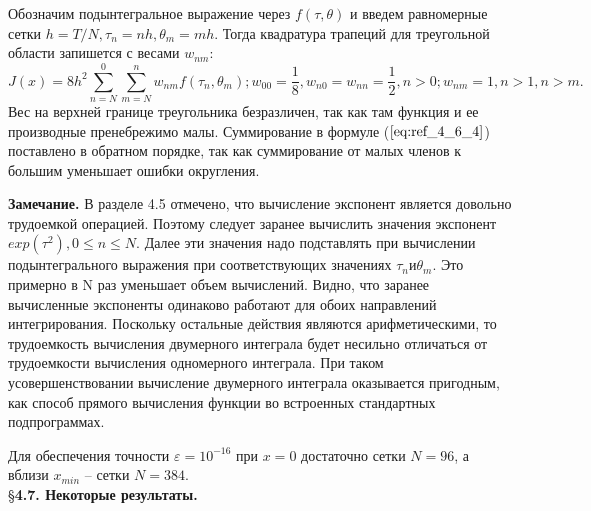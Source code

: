 Обозначим подынтегральное выражение через $f(\tau, \theta)$ и введем
равномерные сетки $h = T/N, \tau_n = nh, \theta_m = mh$. Тогда квадратура трапеций для
треугольной области запишется с весами $w_{nm}$:
\begin{equation}
J(x)=8h^2 \sum_{n=N}^0 \sum_{m=N}^n w_{nm} f(\tau_n, \theta_m);
w_{00}=\frac{1}{8}, w_{n0}=w_{nn}=\frac{1}{2},n>0;w_{nm}=1,n>1,n>m.
\label{eq:ref_4_6_4}
\end{equation}
Вес на верхней границе треугольника безразличен, так как там функция и ее
производные пренебрежимо малы. Суммирование в формуле ($\ref{eq:ref_4_6_4}$) поставлено в
обратном порядке, так как суммирование от малых членов к большим
уменьшает ошибки округления.

\textbf{Замечание.} В разделе 4.5 отмечено, что вычисление экспонент является довольно трудоемкой
операцией. Поэтому следует заранее вычислить значения экспонент $exp(\tau^2), 0 \leqslant n \leqslant N$. Далее эти значения надо подставлять при вычислении
подынтегрального выражения при соответствующих значениях $\tau_n и \theta_m$. Это
примерно в  N раз уменьшает объем вычислений. Видно, что заранее
вычисленные экспоненты одинаково работают для обоих направлений
интегрирования. Поскольку остальные действия являются арифметическими, то
трудоемкость вычисления двумерного интеграла будет несильно отличаться от
трудоемкости вычисления одномерного интеграла. При таком
усовершенствовании вычисление двумерного интеграла оказывается
пригодным, как способ прямого вычисления функции во встроенных
стандартных подпрограммах.

Для обеспечения точности $\varepsilon = 10^{-16}$ при $x = 0$ достаточно сетки $N = 96$, а
вблизи $x_{min}$ – сетки $N = 384$.
\\

\S \textbf{4.7. Некоторые результаты.}
\\

